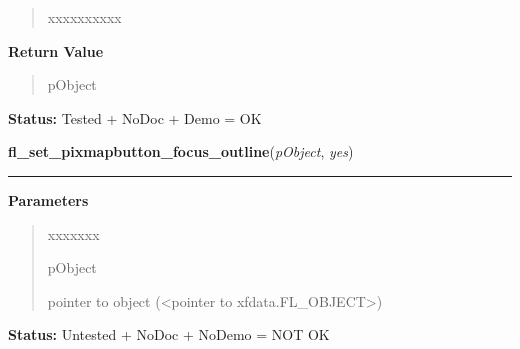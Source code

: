 \begin{boxedminipage}{\funcwidth}
\begin{quote}
\begin{Ventry}{xxxxxxxxxx}
        \end{Ventry}

      \end{quote}

      \textbf{Return Value}
    \vspace{-1ex}

      \begin{quote}
      pObject

      \end{quote}

\textbf{Status:} Tested + NoDoc + Demo = OK



    \end{boxedminipage}

    \label{xformslib:library:fl_set_pixmapbutton_focus_outline}

    \vspace{0.5ex}

\hspace{.8\funcindent}\begin{boxedminipage}{\funcwidth}

    \raggedright \textbf{fl\_set\_pixmapbutton\_focus\_outline}(\textit{pObject}, \textit{yes})

    \vspace{-1.5ex}

    \rule{\textwidth}{0.5\fboxrule}
\setlength{\parskip}{2ex}
\setlength{\parskip}{1ex}
      \textbf{Parameters}
      \vspace{-1ex}

      \begin{quote}
        \begin{Ventry}{xxxxxxx}

          \item[pObject]

          pointer to object ({\textless}pointer to 
          xfdata.FL\_OBJECT{\textgreater})

        \end{Ventry}

      \end{quote}

\textbf{Status:} Untested + NoDoc + NoDemo = NOT OK



    \end{boxedminipage}

